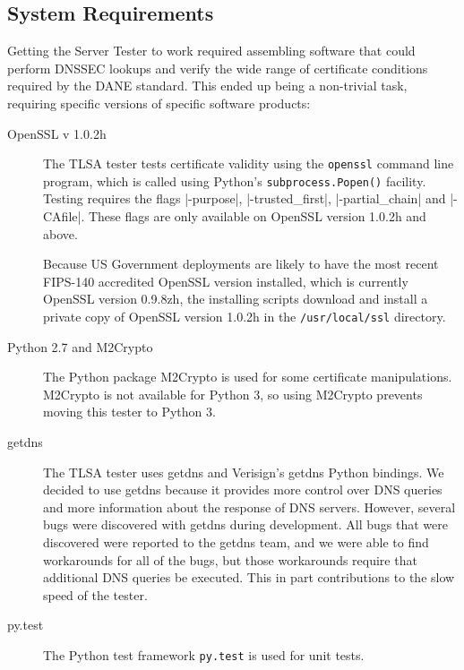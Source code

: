 \documentclass[preprint,3p,11pt]{elsarticle}
\begin{document}


\subsection{System Requirements}

Getting the Server Tester to work required assembling software that
could perform DNSSEC lookups and verify the wide range of certificate
conditions required by the DANE standard. This ended up being a
non-trivial task, requiring specific versions of specific software products:

\begin{description}
\item[OpenSSL v 1.0.2h]
The TLSA tester tests certificate validity using the \verb+openssl+
command line program, which is called using Python's \verb+subprocess.Popen()+
facility. Testing requires the flags |-purpose|, |-trusted_first|,
|-partial_chain| and |-CAfile|. These flags are only available on
OpenSSL version 1.0.2h and above.

Because US Government deployments are likely to have the
most recent FIPS-140 accredited OpenSSL version installed, which is
currently OpenSSL version 0.9.8zh, the installing scripts download and
install a private copy of OpenSSL version 1.0.2h in the
\verb+/usr/local/ssl+ directory.

\item[Python 2.7 and M2Crypto] The Python package M2Crypto is used for some
certificate manipulations. M2Crypto is not available for Python 3, so
using M2Crypto prevents moving this tester to Python 3.

\item[getdns] The TLSA tester uses getdns and Verisign's getdns Python
bindings. We decided to use getdns because it provides more control
over DNS queries and more information about the response of DNS
servers. However, several bugs were discovered with getdns during
development. All bugs that were discovered were reported to the getdns
team, and we were able to find workarounds for all of the bugs, but
those workarounds require that additional DNS queries be
executed. This in part contributions to the slow speed of the tester. 

\item[py.test] The Python test framework \texttt{py.test} is used
for unit tests. 
\end{description}
\end{document}

